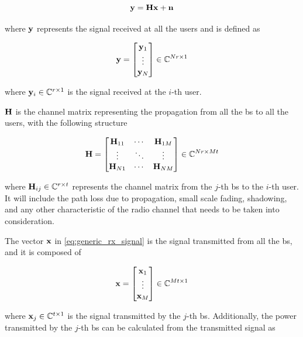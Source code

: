 \begin{equation} \label{eq:generic_system_model}
    \mathbf{y} = \mathbf{H} \mathbf{x} + \mathbf{n}
\end{equation}

\noindent
where $\mathbf{y}$ represents the signal received at all the users and is defined as

\begin{equation} \label{eq:generic_rx_signal}
    \mathbf{y} = \begin{bmatrix}
            \mathbf{y}_1\\
            \vdots\\
            \mathbf{y}_N
        \end{bmatrix} \in \mathbb{C}^{Nr \times 1}
\end{equation}

\noindent
where $\mathbf{y}_i \in \mathbb{C}^{r \times 1}$ is the signal received at the $i$-th user.

$\mathbf{H}$ is the channel matrix representing the propagation from all the \gls{bs}
to all the users, with the following structure

\begin{equation} \label{eq:generic_ch_mat}
    \mathbf{H} = \begin{bmatrix}
            \mathbf{H}_{11} & \cdots & \mathbf{H}_{1M}\\
            \vdots   & \ddots & \vdots\\
            \mathbf{H}_{N1}  & \cdots & \mathbf{H}_{NM}
    \end{bmatrix} \in \mathbb{C}^{Nr \times Mt}
\end{equation}

\noindent
where $\mathbf{H}_{ij} \in \mathbb{C}^{r \times t}$ represents the channel matrix from the
$j$-th \gls{bs} to the $i$-th user. It will include the path loss due to
propagation, small scale fading, shadowing, and any other characteristic of
the radio channel that needs to be taken into consideration.

The vector $\mathbf{x}$ in \eqref{eq:generic_rx_signal} is the signal transmitted from
all the \gls{bs}, and it is composed of

\begin{equation} \label{eq:generic_tx_signal}
    \mathbf{x} = \begin{bmatrix}
        \mathbf{x}_1 \\
        \vdots \\
        \mathbf{x}_M
    \end{bmatrix} \in \mathbb{C}^{Mt \times 1}
\end{equation}

\noindent
where $\mathbf{x}_j \in \mathbb{C}^{t \times 1}$ is the signal transmitted by the $j$-th
\gls{bs}. Additionally, the power transmitted by the $j$-th \gls{bs} can be
calculated from the transmitted signal as

